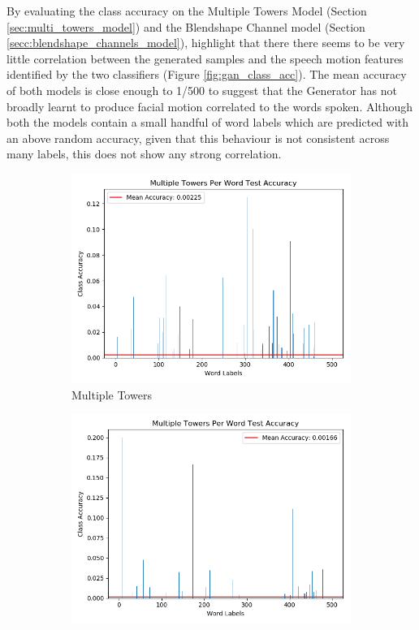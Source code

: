 By evaluating the class accuracy on the Multiple Towers Model (Section \ref{sec:multi_towers_model}) and the Blendshape Channel model (Section \ref{secc:blendshape_channels_model}), highlight that there there seems to be very little correlation between the generated samples and the speech motion features identified by the two classifiers (Figure \ref{fig:gan_class_acc}).
The mean accuracy of both models is close enough to 1/500 to suggest that the Generator has not broadly learnt to produce facial motion correlated to the words spoken.
Although both the models contain a small handful of word labels which are predicted with an above random accuracy, given that this behaviour is not consistent across many labels, this does not show any strong correlation.

\begin{figure}[h!]
    \centering
    \begin{subfigure}[b]{0.49\textwidth}
        \includegraphics[width=\textwidth]{figures/gan/multiple_towers_acc.png}
        \caption{Multiple Towers}\label{fig:gan_multi_towers}
    \end{subfigure}
    \begin{subfigure}[b]{0.49\textwidth}
        \includegraphics[width=\textwidth]{figures/gan/channels_acc.png}

\end{subfigure}
\end{figure}
